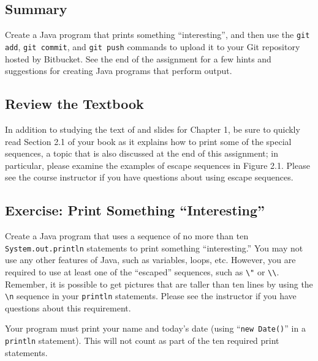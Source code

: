 


\subsection*{Summary}

Create a Java program that prints something ``interesting'', and then use the {\tt git add}, {\tt git commit}, and {\tt git
  push} commands to upload it to your Git repository hosted by Bitbucket. See the end of the assignment for a few hints
and suggestions for creating Java programs that perform output.

\vspace*{-.1in}
\subsection*{Review the Textbook}

In addition to studying the text of and slides for Chapter 1, be sure to quickly read Section 2.1 of your book as it
explains how to print some of the special sequences, a topic that is also discussed at the end of this assignment; in
particular, please examine the examples of escape sequences in Figure 2.1. Please see the course instructor if you have
questions about using escape sequences.

\vspace*{-.1in}
\subsection*{Exercise: Print Something ``Interesting''}

Create a Java program that uses a sequence of no more than ten {\tt System.out.println} statements to print something
``interesting.'' You may not use any other features of Java, such as variables, loops, etc.  However, you are required
to use at least one of the ``escaped'' sequences, such as \verb$\"$ or \verb$\\$.  Remember, it is possible to get
pictures that are taller than ten lines by using the \verb$\n$ sequence in your {\tt println} statements. Please see the
instructor if you have questions about this requirement.

Your program must print your name and today's date (using ``{\tt new Date()}'' in a {\tt println} statement).  This will
not count as part of the ten required print statements.

